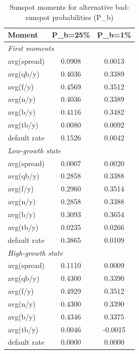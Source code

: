 \begin{table}[!htbp]
\centering
\caption{Sunspot moments for alternative bad-sunspot probabilities (P_b)}
\begin{tabular}{lcc}
\hline
Moment & P_b=25\% & P_b=1\% \\
\hline
\multicolumn{3}{l}{\textit{First moments}} \\
avg(spread) & 0.0908 & 0.0013 \\
avg(qb/y) & 0.4036 & 0.3389 \\
avg(f/y) & 0.4569 & 0.3512 \\
avg(n/y) & 0.4036 & 0.3389 \\
avg(b/y) & 0.4116 & 0.3482 \\
avg(tb/y) & 0.0080 & 0.0092 \\
default rate & 0.1526 & 0.0042 \\
\hline
\multicolumn{3}{l}{\textit{Low-growth state}} \\
avg(spread) & 0.0007 & 0.0020 \\
avg(qb/y) & 0.2858 & 0.3388 \\
avg(f/y) & 0.2960 & 0.3514 \\
avg(n/y) & 0.2858 & 0.3388 \\
avg(b/y) & 0.3093 & 0.3654 \\
avg(tb/y) & 0.0235 & 0.0266 \\
default rate & 0.3865 & 0.0109 \\
\hline
\multicolumn{3}{l}{\textit{High-growth state}} \\
avg(spread) & 0.1110 & 0.0009 \\
avg(qb/y) & 0.4300 & 0.3390 \\
avg(f/y) & 0.4929 & 0.3512 \\
avg(n/y) & 0.4300 & 0.3390 \\
avg(b/y) & 0.4346 & 0.3375 \\
avg(tb/y) & 0.0046 & -0.0015 \\
default rate & 0.0000 & 0.0000 \\
\hline
\end{tabular}
\end{table}